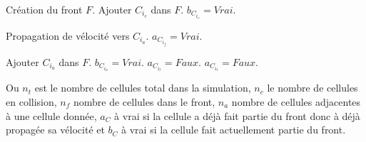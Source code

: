\documentclass[a4paper,11pt]{article}
\begin{document}
\medbreak
\begin{algorithmic}[1]
   \STATE Création du front $F$.
      \STATE Ajouter $C_{i_c}$ dans $F$.
      \STATE $b_{C_{i_c}} = Vrai$.
      
	    \STATE Propagation de vélocité vers $C_{i_a}$.
	  \ENDIF
	\ENDFOR
	\STATE $a_{C_{i_f}} = Vrai$.
      \ENDFOR

	    \STATE Ajouter $C_{i_a}$ dans $F$.
	    \STATE $b_{C_{i_a}} = Vrai$.
	  \ENDIF
	\ENDFOR
      \ENDFOR
      \ENDWHILE
	\STATE $a_{C_{i_t}} = Faux$.
	\STATE $a_{C_{i_t}} = Faux$.
      \ENDFOR
   \ENDFOR
\end{algorithmic}
\medbreak

Ou $n_t$ est le nombre de cellules total dans la simulation, $n_c$ le nombre de cellules en collision, $n_f$ nombre de cellules dans le front, $n_a$ nombre de cellules adjacentes à une cellule donnée, $a_C$ à vrai si la cellule a déjà fait partie du front donc à déjà propagée sa vélocité et $b_C$ à vrai si la cellule fait actuellement partie du front. \\
\end{document}
